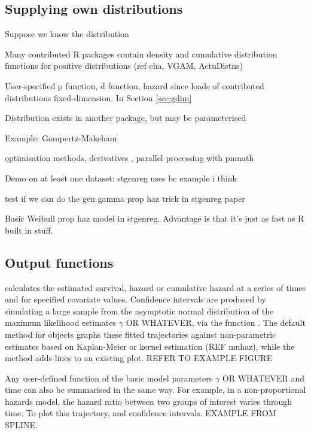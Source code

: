 \documentclass[nojss,nofooter]{jss}\usepackage[]{graphicx}\usepackage[]{color}
\begin{document}
\subsection{Supplying own distributions}

Suppose we know the distribution 

Many contributed R packages contain density and cumulative
distribution functions for positive distributions (ref eha, VGAM,
ActuDistns)

User-specified p function, d function, hazard
since loads of contributed distributions
fixed-dimension.   In Section \ref{sec:gdim} 

Distribution exists in another package, but may be parameterised 

Example: Gompertz-Makeham


optimisation methods, derivatives , parallel processing with pnmath

Demo on at least one dataset: stgenreg uses bc example i think

test if we can do the gen gamma prop haz trick in stgenreg paper

Basic Weibull prop haz model in stgenreg.  Advantage is that it's just as fast as R built in stuff.



\subsection{Output functions}

 calculates the estimated survival, hazard
or cumulative hazard at a series of times and for specified covariate
values. Confidence intervals are produced by simulating a large sample
from the asymptotic normal distribution of the maximum likelihood
estimates $\gamma$ OR WHATEVER, via the function
.  The default  method for
 objects graphs these fitted trajectories against
non-parametric estimates based on Kaplan-Meier or kernel estimation
(REF muhaz), while the  method adds lines to an existing
plot.  REFER TO EXAMPLE FIGURE

Any user-defined function of the basic model parameters $\gamma$ OR
WHATEVER and time can also be summarised in the same way.  For
example, in a non-proportional hazards model, the hazard ratio between
two groups of interest varies through time.  To plot this trajectory,
and confidence intervals.   EXAMPLE FROM SPLINE. 
\end{document}
